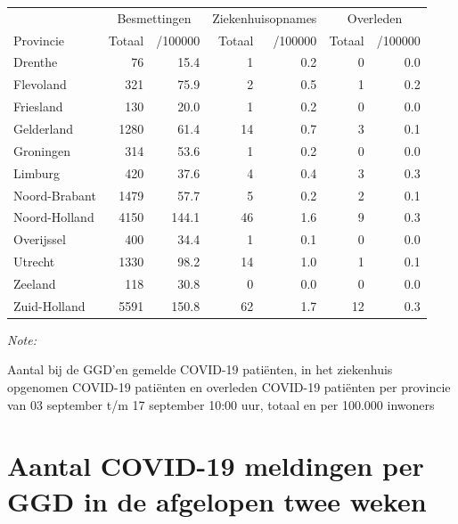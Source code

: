 \documentclass[
  english,
  man,floatsintext]{apa6}
\begin{document}
\begin{table}[H]
\centering
\begin{threeparttable}
\begin{tabular}{lrrrrrr}
\toprule
\multicolumn{1}{c}{ } & \multicolumn{2}{c}{Besmettingen} & \multicolumn{2}{c}{Ziekenhuisopnames} & \multicolumn{2}{c}{Overleden} \\
\cmidrule(l{3pt}r{3pt}){2-3} \cmidrule(l{3pt}r{3pt}){4-5} \cmidrule(l{3pt}r{3pt}){6-7}
Provincie & Totaal & /100000 & Totaal & /100000 & Totaal & /100000\\
\midrule
Drenthe & 76 & 15.4 & 1 & 0.2 & 0 & 0.0\\
Flevoland & 321 & 75.9 & 2 & 0.5 & 1 & 0.2\\
Friesland & 130 & 20.0 & 1 & 0.2 & 0 & 0.0\\
Gelderland & 1280 & 61.4 & 14 & 0.7 & 3 & 0.1\\
Groningen & 314 & 53.6 & 1 & 0.2 & 0 & 0.0\\
Limburg & 420 & 37.6 & 4 & 0.4 & 3 & 0.3\\
Noord-Brabant & 1479 & 57.7 & 5 & 0.2 & 2 & 0.1\\
Noord-Holland & 4150 & 144.1 & 46 & 1.6 & 9 & 0.3\\
Overijssel & 400 & 34.4 & 1 & 0.1 & 0 & 0.0\\
Utrecht & 1330 & 98.2 & 14 & 1.0 & 1 & 0.1\\
Zeeland & 118 & 30.8 & 0 & 0.0 & 0 & 0.0\\
Zuid-Holland & 5591 & 150.8 & 62 & 1.7 & 12 & 0.3\\
\bottomrule
\end{tabular}
\begin{tablenotes}
\item \textit{Note: } 
\item Aantal bij de GGD’en gemelde COVID-19 patiënten, in het ziekenhuis opgenomen COVID-19 patiënten en overleden COVID-19 patiënten per provincie van 03 september t/m 17 september 10:00 uur, totaal en per 100.000 inwoners
\end{tablenotes}
\end{threeparttable}
\end{table}

\newpage

\hypertarget{aantal-covid-19-meldingen-per-ggd-in-de-afgelopen-twee-weken}{%
\section{Aantal COVID-19 meldingen per GGD in de afgelopen twee weken}\label{aantal-covid-19-meldingen-per-ggd-in-de-afgelopen-twee-weken}}
\end{document}
